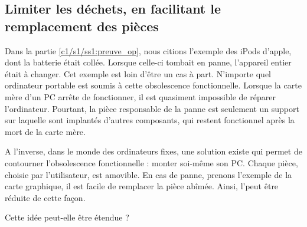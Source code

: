 \subsection{Limiter les déchets, en facilitant le remplacement des pièces }

Dans la partie \ref{c1/s1/ss1:preuve_op}, nous citions l'exemple des iPods d'apple, dont la batterie était collée. Lorsque celle-ci tombait en panne,  l'appareil entier était à changer. 
Cet exemple est loin d'être un cas à part. N'importe quel ordinateur portable est soumis à cette obsolescence fonctionnelle. Lorsque la carte mère d'un PC arrête de fonctionner, il est quasiment impossible de réparer l'ordinateur. Pourtant, la pièce responsable de la panne est seulement un support sur laquelle sont implantés d'autres composants, qui restent fonctionnel après la mort de la carte mère.  

A l'inverse, dans le monde des ordinateurs fixes, une solution existe qui permet de contourner l'obsolescence fonctionnelle : monter soi-même son PC. Chaque pièce, choisie par l'utilisateur, est amovible. En cas de panne, prenons l'exemple de la carte graphique, il est facile de remplacer la pièce abîmée. Ainsi, l'\op peut être réduite de cette façon. 


Cette idée peut-elle être étendue ? 

\bigbreak

